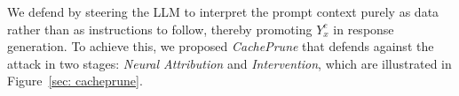 

We defend by steering the LLM to interpret the prompt context purely as data rather than as instructions to follow, thereby promoting $Y^c_x$ in response generation.
To achieve this, we proposed \textit{CachePrune} that defends against the attack in two stages: \textit{Neural Attribution} and \textit{Intervention}, which are illustrated in Figure~\ref{sec: cacheprune}.



